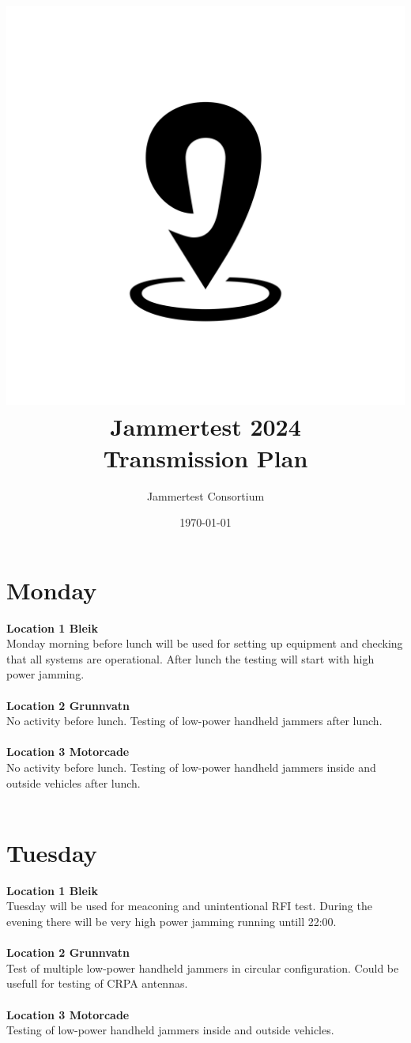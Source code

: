 \documentclass[a4paper]{book}
\title{\includegraphics[scale=0.2]{graphics/jampin.png}\\ Jammertest 2024 \\ \huge{Transmission Plan}}
\author{Jammertest Consortium}
\date{\today \\ \DTMcurrenttime}
\begin{document}
\maketitle

\tableofcontents
\restoregeometry

\begin{landscape}

\chapter{Monday}
\Large \textbf{Location 1 Bleik} \\
Monday morning before lunch will be used for setting up equipment and checking that all systems are operational. After lunch the testing will start with high power jamming.\\ \\
\Large \textbf{Location 2 Grunnvatn} \\
No activity before lunch. Testing of low-power handheld jammers after lunch.\\ \\
\Large \textbf{Location 3 Motorcade} \\
No activity before lunch. Testing of low-power handheld jammers inside and outside vehicles after lunch.\\ \\

%

\chapter{Tuesday}
\Large \textbf{Location 1 Bleik} \\
Tuesday will be used for meaconing and unintentional RFI test. During the evening there will be very high power jamming running untill 22:00. \\ \\
\Large \textbf{Location 2 Grunnvatn} \\ 
Test of multiple low-power handheld jammers in circular configuration. Could be usefull for testing of CRPA antennas. \\ \\ 
\Large \textbf{Location 3 Motorcade} \\
Testing of low-power handheld jammers inside and outside vehicles. \\ \\

%


\end{landscape}
\end{document}
